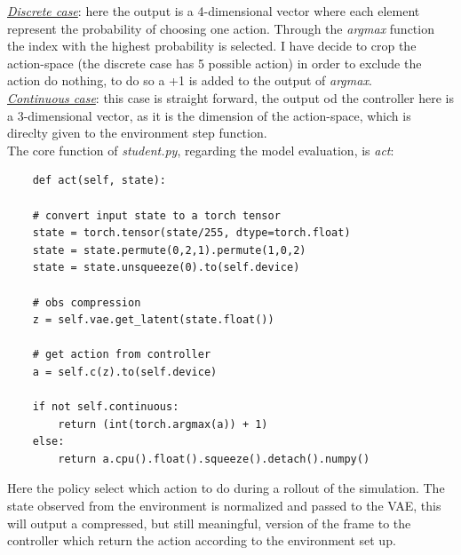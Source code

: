 \documentclass[10pt,a4paper]{article}
\begin{document}
\underline{\textit{Discrete case}}: here the output is a 4-dimensional vector where each element represent the probability of choosing one action. Through the \textit{argmax} function the index with the highest probability is selected. I have decide to crop the action-space (the discrete case has 5 possible action) in order to exclude the action do nothing, to do so a +1 is added to the output of \textit{argmax}.\\

\underline{\textit{Continuous case}}: this case is straight forward, the output od the controller here is a 3-dimensional vector, as it is the dimension of the action-space, which is direclty given to the environment step function.\\

\noindent The core function of \textit{student.py}, regarding the model evaluation, is \textit{act}:
\begin{lstlisting}
    def act(self, state):

    # convert input state to a torch tensor
    state = torch.tensor(state/255, dtype=torch.float)
    state = state.permute(0,2,1).permute(1,0,2)
    state = state.unsqueeze(0).to(self.device)

    # obs compression
    z = self.vae.get_latent(state.float())
    
    # get action from controller
    a = self.c(z).to(self.device)   

    if not self.continuous:
        return (int(torch.argmax(a)) + 1)
    else:
        return a.cpu().float().squeeze().detach().numpy()
\end{lstlisting}

Here the policy select which action to do during a rollout of the simulation. The state observed from the environment is normalized and passed to the VAE, this will output a compressed, but still meaningful, version of the frame to the controller which return the action according to the environment set up.
\end{document}
